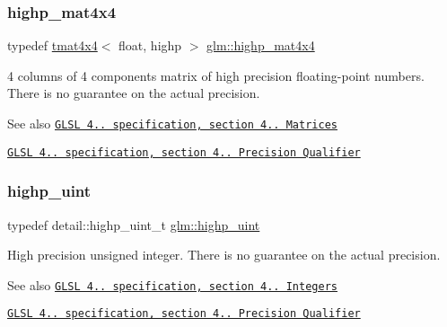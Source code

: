 \subsubsection{\texorpdfstring{highp\+\_\+mat4x4}{highp\_mat4x4}}
{\footnotesize\ttfamily typedef \hyperlink{structglm_1_1tmat4x4}{tmat4x4}$<$ float, highp $>$ \hyperlink{group__core__precision_gaccec2a0346f946bcbd656386a9ab87d7}{glm\+::highp\+\_\+mat4x4}}

4 columns of 4 components matrix of high precision floating-\/point numbers. There is no guarantee on the actual precision.

\begin{DoxySeeAlso}{See also}
\href{http://www.opengl.org/registry/doc/GLSLangSpec.4.20.8.pdf}{\tt G\+L\+SL 4.. specification, section 4.. Matrices} 

\href{http://www.opengl.org/registry/doc/GLSLangSpec.4.20.8.pdf}{\tt G\+L\+SL 4.. specification, section 4.. Precision Qualifier} 
\end{DoxySeeAlso}
\mbox{\label{group__core__precision_gabfd1cf11193324a5f77d3831b6ac3205}} 
\subsubsection{\texorpdfstring{highp\+\_\+uint}{highp\_uint}}
{\footnotesize\ttfamily typedef detail\+::highp\+\_\+uint\+\_\+t \hyperlink{group__core__precision_gabfd1cf11193324a5f77d3831b6ac3205}{glm\+::highp\+\_\+uint}}

High precision unsigned integer. There is no guarantee on the actual precision.

\begin{DoxySeeAlso}{See also}
\href{http://www.opengl.org/registry/doc/GLSLangSpec.4.20.8.pdf}{\tt G\+L\+SL 4.. specification, section 4.. Integers} 

\href{http://www.opengl.org/registry/doc/GLSLangSpec.4.20.8.pdf}{\tt G\+L\+SL 4.. specification, section 4.. Precision Qualifier} 
\end{DoxySeeAlso}
\mbox{\label{group__core__precision_ga386eaa1579a0f5ad51cd7d8fcd52ec16}} 
